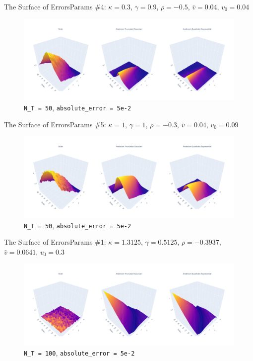 \begin{frame}{The Surface of Errors}{Params \#4: $\kappa = 0.3$, $\gamma = 0.9$, $\rho = -0.5$, $\bar v = 0.04$, $v_0 = 0.04$}
    \begin{figure}
        \includegraphics[width=\textwidth]{part4/pictures/err_surface_strike_T_N_T=50_param4.pdf}
        \caption{\texttt{N\_T = 50}, \texttt{absolute\_error = 5e-2}}
    \end{figure}
\end{frame}

\begin{frame}{The Surface of Errors}{Params \#5: $\kappa = 1$, $\gamma = 1$, $\rho = -0.3$, $\bar v = 0.04$, $v_0 = 0.09$}
    \begin{figure}
        \includegraphics[width=\textwidth]{part4/pictures/err_surface_strike_T_N_T=50_param5.pdf}
        \caption{\texttt{N\_T = 50}, \texttt{absolute\_error = 5e-2}}
    \end{figure}
\end{frame}

\begin{frame}{The Surface of Errors}{Params \#1: $\kappa = 1.3125$, $\gamma = 0.5125$, $\rho = -0.3937$, $\bar v = 0.0641$, $v_0 = 0.3$}
    \begin{figure}
        \includegraphics[width=\textwidth]{part4/pictures/err_surface_strike_T_N_T=100_param1.pdf}
        \caption{\texttt{N\_T = 100}, \texttt{absolute\_error = 5e-2}}
    \end{figure}
\end{frame}

